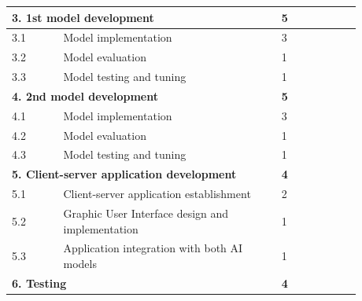 \documentclass{article}
\begin{document}
\begin{center}
\begin{tabular}{ |p{0.13\linewidth}|p{0.55\linewidth}|p{0.20\linewidth}| }
        \hline
        \multicolumn{2}{|l|}{\textbf{3. 1st model development}}                 & \textbf{5}                                                              \\
        \hline
        3.1                                                                     & Model implementation                                 & 3                \\
        \hline
        3.2                                                                     & Model evaluation                                     & 1                \\
        \hline
        3.3                                                                     & Model testing and tuning                             & 1                \\
        \hline
        \multicolumn{2}{|l|}{\textbf{4. 2nd model development}}                 & \textbf{5}                                                              \\
        \hline
        4.1                                                                     & Model implementation                                 & 3                \\
        \hline
        4.2                                                                     & Model evaluation                                     & 1                \\
        \hline
        4.3                                                                     & Model testing and tuning                             & 1                \\
        \hline
        \multicolumn{2}{|l|}{\textbf{5. Client-server application development}} & \textbf{4}                                                              \\
        \hline
        5.1                                                                     & Client-server application establishment              & 2                \\
        \hline
        5.2                                                                     & Graphic User Interface design and implementation     & 1                \\
        \hline
        5.3                                                                     & Application integration with both AI models          & 1                \\
        \hline
        \multicolumn{2}{|l|}{\textbf{6. Testing}}                               & \textbf{4}                                                              \\

\end{tabular}
\end{center}
\end{document}
